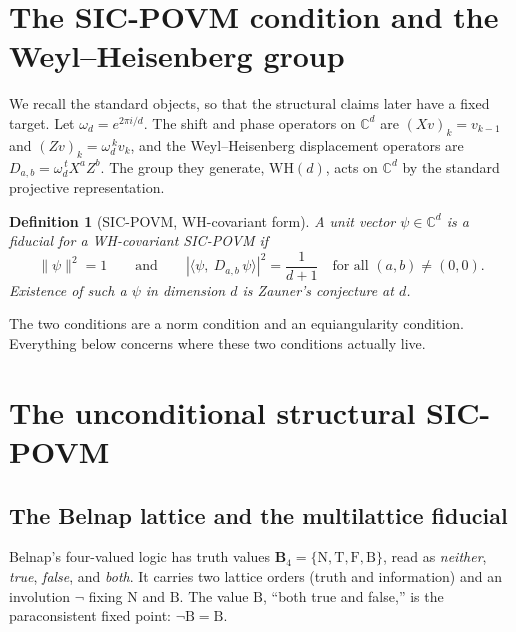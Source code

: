 \documentclass[12pt,a4paper]{article}
\newtheorem{definition}[theorem]{Definition}
\newcommand{\BFour}{\mathbf{B}_4}
\newcommand{\WH}{\mathrm{WH}}
\begin{document}
\section{The SIC-POVM condition and the Weyl--Heisenberg group}

We recall the standard objects, so that the structural claims later have a
fixed target. Let $\omega_d = e^{2\pi i / d}$. The shift and phase operators on
$\mathbb{C}^d$ are $(X v)_k = v_{k-1}$ and $(Z v)_k = \omega_d^{\,k} v_k$, and
the Weyl--Heisenberg displacement operators are
$D_{a,b} = \omega_d^{\,t} X^a Z^b$. The group they generate, $\WH(d)$, acts on
$\mathbb{C}^d$ by the standard projective representation.

\begin{definition}[SIC-POVM, WH-covariant form]
A unit vector $\psi \in \mathbb{C}^d$ is a \emph{fiducial} for a WH-covariant
SIC-POVM if
\[
\|\psi\|^2 = 1
\qquad\text{and}\qquad
|\langle \psi,\ D_{a,b}\,\psi\rangle|^2 = \frac{1}{d+1}
\quad\text{for all } (a,b) \neq (0,0).
\]
Existence of such a $\psi$ in dimension $d$ is \emph{Zauner's conjecture at
$d$}.
\end{definition}

The two conditions are a norm condition and an equiangularity condition.
Everything below concerns where these two conditions actually live.

\section{The unconditional structural SIC-POVM}
\label{sec:core}

\subsection{The Belnap lattice and the multilattice fiducial}

Belnap's four-valued logic \cite{Belnap1977} has truth values
$\BFour = \{\mathrm{N},\mathrm{T},\mathrm{F},\mathrm{B}\}$, read as
\emph{neither}, \emph{true}, \emph{false}, and \emph{both}. It carries two
lattice orders (truth and information) and an involution $\neg$ fixing
$\mathrm{N}$ and $\mathrm{B}$. The value $\mathrm{B}$, ``both true and false,''
is the paraconsistent fixed point: $\neg \mathrm{B} = \mathrm{B}$.
\end{document}
